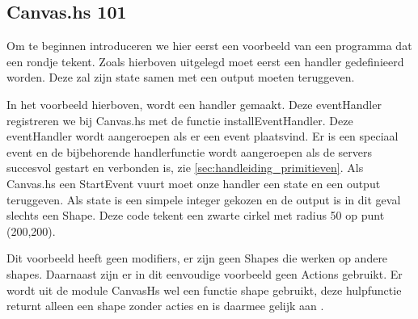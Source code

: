 \subsection{Canvas.hs 101}
Om te beginnen introduceren we hier eerst een voorbeeld van een programma dat een rondje tekent. Zoals hierboven uitgelegd moet eerst een handler gedefinieerd worden. Deze zal zijn state samen met een output moeten teruggeven.



In het voorbeeld hierboven, wordt een handler gemaakt. Deze eventHandler registreren we bij Canvas.hs met de functie installEventHandler. Deze eventHandler wordt aangeroepen als er een event plaatsvind. Er is een speciaal  event en de bijbehorende handlerfunctie wordt aangeroepen als de servers succesvol gestart en verbonden is, zie \autoref{sec:handleiding_primitieven}. Als Canvas.hs een StartEvent vuurt moet onze handler een state en een output teruggeven. Als state is een simpele integer gekozen en de output is in dit geval slechts een Shape. Deze code tekent een zwarte cirkel met radius 50 op punt (200,200).

Dit voorbeeld heeft geen modifiers, er zijn geen Shapes die werken op andere shapes. Daarnaast zijn er in dit eenvoudige voorbeeld geen Actions gebruikt. Er wordt uit de module CanvasHs wel een functie shape gebruikt, deze hulpfunctie returnt alleen een shape zonder acties en is daarmee gelijk aan .
